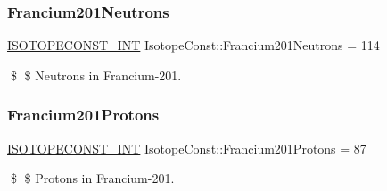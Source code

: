 \subsubsection{\texorpdfstring{Francium201\+Neutrons}{Francium201Neutrons}}
{\footnotesize\ttfamily \mbox{\hyperlink{group___isotope_const-_macros_ga5f18360b3e99483a35c32d789e62621c}{I\+S\+O\+T\+O\+P\+E\+C\+O\+N\+S\+T\+\_\+\+I\+NT}} Isotope\+Const\+::\+Francium201\+Neutrons = 114}

\$ \$ Neutrons in Francium-\/201. \mbox{\label{group___isotope_const-_francium-_fr201_gab5d34dc4f22e942e8eb7e91eb7103d74}} 
\subsubsection{\texorpdfstring{Francium201\+Protons}{Francium201Protons}}
{\footnotesize\ttfamily \mbox{\hyperlink{group___isotope_const-_macros_ga5f18360b3e99483a35c32d789e62621c}{I\+S\+O\+T\+O\+P\+E\+C\+O\+N\+S\+T\+\_\+\+I\+NT}} Isotope\+Const\+::\+Francium201\+Protons = 87}

\$ \$ Protons in Francium-\/201. 